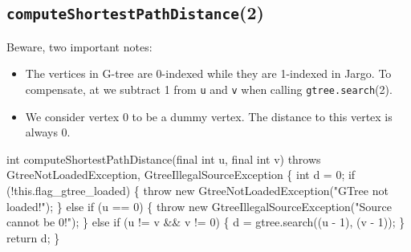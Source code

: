 \subsection{\texttt{computeShortestPathDistance}(2)}
Beware, two important notes:
\begin{itemize}
\item The vertices in G-tree are 0-indexed while they are 1-indexed in Jargo.
To compensate, at we subtract 1 from {\tt{}u} and {\tt{}v} when calling
{\tt{}gtree.search}(2).
\item We consider vertex 0 to be a dummy vertex. The distance to this vertex
is always 0.
\end{itemize}
\nwenddocs{}\endmoddef{}
int computeShortestPathDistance(final int u, final int v)
throws GtreeNotLoadedException, GtreeIllegalSourceException \{
  int d = 0;
  if (!this.flag_gtree_loaded) \{
    throw new GtreeNotLoadedException("GTree not loaded!");
  \} else if (u == 0) \{
    throw new GtreeIllegalSourceException("Source cannot be 0!");
  \} else if (u != v && v != 0) \{
    d = gtree.search((u - 1), (v - 1));
  \}
  return d;
\}
\eatline
{}\nwendcode{}\nwdocspar
